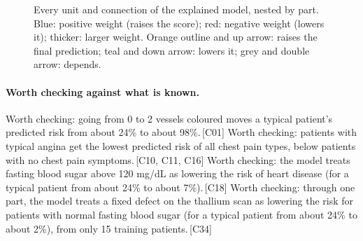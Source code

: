 \documentclass[a4paper,10pt]{article}
\newif\ifreviewmarks
\newcommand{\reviewrule}{\noindent{\color{BrickRed}\rule{\linewidth}{0.8pt}}}
\newenvironment{drafted}[1][]{%
  \ifreviewmarks\par\addvspace{\medskipamount}\reviewrule\par\nopagebreak
  \noindent{\color{BrickRed}\sffamily\footnotesize\textbf{Thesis Draft}\quad #1\hfill review}\par\nopagebreak\smallskip\fi}{%
  \ifreviewmarks\par\smallskip\noindent{\color{BrickRed}\sffamily\footnotesize end of thesis draft}\par\nopagebreak\reviewrule\par\medskip\fi}
\begin{document}
\begin{drafted}[plain-language layer: heart-s4-c1]
\begin{landscape}
\begin{figure}[p]
{}%
\caption{Every unit and connection of the explained model, nested by part. Blue: positive weight (raises the score); red: negative weight (lowers it); thicker: larger weight. Orange outline and up arrow: raises the final prediction; teal and down arrow: lowers it; grey and double arrow: depends.}
\label{fig:hearts4c1:overview}
\end{figure}
\end{landscape}
\paragraph{Worth checking against what is known.} Worth checking: going from 0 to 2 vessels coloured moves a typical patient's predicted risk from about 24\% to about 98\%.\,{\scriptsize\textcolor{NavyBlue}{[C01]}} Worth checking: patients with typical angina get the lowest predicted risk of all chest pain types, below patients with no chest pain symptoms.\,{\scriptsize\textcolor{NavyBlue}{[C10, C11, C16]}} Worth checking: the model treats fasting blood sugar above 120 mg/dL as lowering the risk of heart disease (for a typical patient from about 24\% to about 7\%).\,{\scriptsize\textcolor{NavyBlue}{[C18]}} Worth checking: through one part, the model treats a fixed defect on the thallium scan as lowering the risk for patients with normal fasting blood sugar (for a typical patient from about 24\% to about 2\%), from only 15 training patients.\,{\scriptsize\textcolor{NavyBlue}{[C34]}}

\end{drafted}
\end{document}
